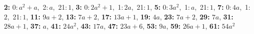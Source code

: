\textsf{\bfseries 2:} 0:\,$a^2 + a$,\ 2:\,$a$,\ 21:\,$1$, \textsf{\bfseries 3:} 0:\,$2a^2 + 1$,\ 1:\,$2a$,\ 21:\,$1$, \textsf{\bfseries 5:} 0:\,$3a^2$,\ 1:\,$a$,\ 21:\,$1$, \textsf{\bfseries 7:} 0:\,$4a$,\ 1:\,$2$,\ 21:\,$1$, \textsf{\bfseries 11:} $9a + 2$, \textsf{\bfseries 13:} $7a + 2$, \textsf{\bfseries 17:} $13a + 1$, \textsf{\bfseries 19:} $4a$, \textsf{\bfseries 23:} $7a + 2$, \textsf{\bfseries 29:} $7a$, \textsf{\bfseries 31:} $28a + 1$, \textsf{\bfseries 37:} $a$, \textsf{\bfseries 41:} $24a^2$, \textsf{\bfseries 43:} $17a$, \textsf{\bfseries 47:} $23a + 6$, \textsf{\bfseries 53:} $9a$, \textsf{\bfseries 59:} $26a + 1$, \textsf{\bfseries 61:} $54a^2$